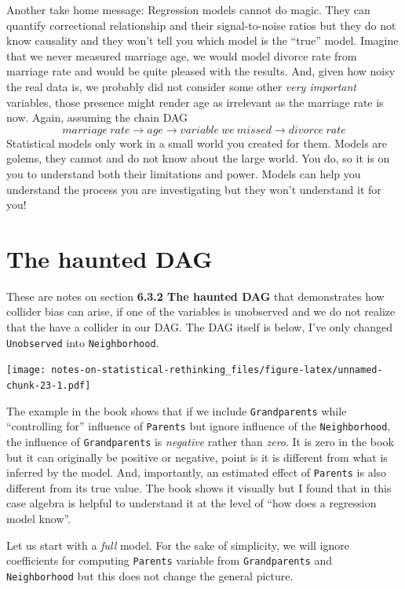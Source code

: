 \documentclass[
]{book}
\begin{document}
Another take home message: Regression models cannot do magic. They can quantify correctional relationship and their signal-to-noise ratios but they do not know causality and they won't tell you which model is the ``true'' model. Imagine that we never measured marriage age, we would model divorce rate from marriage rate and would be quite pleased with the results. And, given how noisy the real data is, we probably did not consider some other \emph{very important} variables, those presence might render age as irrelevant as the marriage rate is now. Again, assuming the chain DAG
\[marriage~rate \rightarrow age \rightarrow variable~we~missed \rightarrow divorce~rate\]
Statistical models only work in a small world you created for them. Models are golems, they cannot and do not know about the large world. You do, so it is on you to understand both their limitations and power. Models can help you understand the process you are investigating but they won't understand it for you!

\hypertarget{the-haunted-dag}{%
\chapter{The haunted DAG}\label{the-haunted-dag}}

These are notes on section \textbf{6.3.2 The haunted DAG} that demonstrates how collider bias can arise, if one of the variables is unobserved and we do not realize that the have a collider in our DAG. The DAG itself is below, I've only changed \texttt{Unobserved} into \texttt{Neighborhood}.

\texttt{[image: notes-on-statistical-rethinking\_files/figure-latex/unnamed-chunk-23-1.pdf]}

The example in the book shows that if we include \texttt{Grandparents} while ``controlling for'' influence of \texttt{Parents} but ignore influence of the \texttt{Neighborhood}, the influence of \texttt{Grandparents} is \emph{negative} rather than \emph{zero}. It is zero in the book but it can originally be positive or negative, point is it is different from what is inferred by the model. And, importantly, an estimated effect of \texttt{Parents} is also different from its true value. The book shows it visually but I found that in this case algebra is helpful to understand it at the level of ``how does a regression model know''.

Let us start with a \emph{full} model. For the sake of simplicity, we will ignore coefficients for computing \texttt{Parents} variable from \texttt{Grandparents} and \texttt{Neighborhood} but this does not change the general picture.
\end{document}
